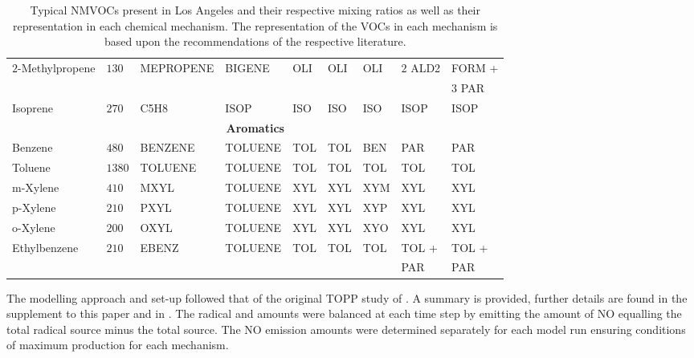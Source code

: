 \begin{table}
\begin{center}
\begin{tabular}{lllllllll}
            \multirow{2}{*}{$2$-Methylpropene} & \multirow{2}{*}{$130$} & \multirow{2}{*}{MEPROPENE} & \multirow{2}{*}{BIGENE} & \multirow{2}{*}{OLI} & \multirow{2}{*}{OLI} & \multirow{2}{*}{OLI} & \multirow{2}{*}{$2$ ALD2} & FORM + \\ & & & & & & & & \hspace{3mm}$3$ PAR \\
            Isoprene & $270$ & C5H8 & ISOP & ISO & ISO & ISO & ISOP & ISOP \\ \hline
            \multicolumn{9}{c}{\textbf{Aromatics}} \\ \hline 
            Benzene & $480$ & BENZENE & TOLUENE & TOL & TOL & BEN & PAR & PAR \\
            Toluene & $1380$ & TOLUENE & TOLUENE & TOL & TOL & TOL & TOL & TOL \\
            m-Xylene & $410$ & MXYL & TOLUENE & XYL & XYL & XYM & XYL & XYL \\
            p-Xylene & $210$ & PXYL & TOLUENE & XYL & XYL & XYP & XYL & XYL \\
            o-Xylene & $200$ & OXYL & TOLUENE & XYL & XYL & XYO & XYL & XYL \\
            \multirow{2}{*}{Ethylbenzene} & \multirow{2}{*}{$210$} & \multirow{2}{*}{EBENZ} & \multirow{2}{*}{TOLUENE} & \multirow{2}{*}{TOL} & \multirow{2}{*}{TOL} & \multirow{2}{*}{TOL} & TOL + & TOL + \\ & & & & & & & \hspace{3mm}PAR & \hspace{3mm}PAR \\ \hline \hline
        \end{tabular}
    \end{center}
    \caption{Typical NMVOCs present in Los Angeles and their respective mixing ratios \citep{Baker:2008} as well as their representation in each chemical mechanism. The representation of the VOCs in each mechanism is based upon the recommendations of the respective literature.}
    \label{t:initial_conditions}
\end{table}

The modelling approach and set-up followed that of the original TOPP study of \citet{Butler:2011}.
A summary is provided, further details are found in the supplement to this paper and in \citet{Butler:2011}. 
The radical and  amounts were balanced at each time step by emitting the amount of NO equalling the total radical source minus the total  source.
The NO emission amounts were determined separately for each model run ensuring conditions of maximum  production for each mechanism.

